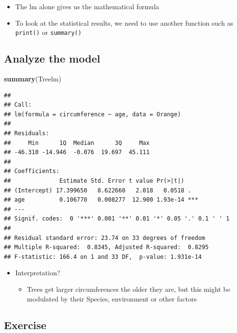\documentclass[
]{book}
\newenvironment{Shaded}{\begin{snugshade}}{\end{snugshade}}
\newcommand{\FunctionTok}[1]{\textcolor[rgb]{0.13,0.29,0.53}{\textbf{#1}}}
\newcommand{\NormalTok}[1]{#1}
\providecommand{\tightlist}{%
  \setlength{\itemsep}{0pt}\setlength{\parskip}{0pt}}
\begin{document}
\begin{itemize}
\tightlist
\item
  The lm alone gives us the mathematical formula
\item
  To look at the statistical results, we need to use another function such as \texttt{print()} or \texttt{summary()}
\end{itemize}

\subsection{Analyze the model}\label{analyze-the-model}

\begin{Shaded}
\begin{Highlighting}[]
\FunctionTok{summary}\NormalTok{(Treelm)}
\end{Highlighting}
\end{Shaded}

\begin{verbatim}
## 
## Call:
## lm(formula = circumference ~ age, data = Orange)
## 
## Residuals:
##     Min      1Q  Median      3Q     Max 
## -46.310 -14.946  -0.076  19.697  45.111 
## 
## Coefficients:
##              Estimate Std. Error t value Pr(>|t|)    
## (Intercept) 17.399650   8.622660   2.018   0.0518 .  
## age          0.106770   0.008277  12.900 1.93e-14 ***
## ---
## Signif. codes:  0 '***' 0.001 '**' 0.01 '*' 0.05 '.' 0.1 ' ' 1
## 
## Residual standard error: 23.74 on 33 degrees of freedom
## Multiple R-squared:  0.8345, Adjusted R-squared:  0.8295 
## F-statistic: 166.4 on 1 and 33 DF,  p-value: 1.931e-14
\end{verbatim}

\begin{itemize}
\tightlist
\item
  Interpretation?

  \begin{itemize}
  \tightlist
  \item
    Trees get larger circumferences the older they are, but this might be modulated by their Species, environment or other factors
  \end{itemize}
\end{itemize}

\subsection{\texorpdfstring{Exercise }{Exercise  }}\label{exercise-9}
\end{document}
